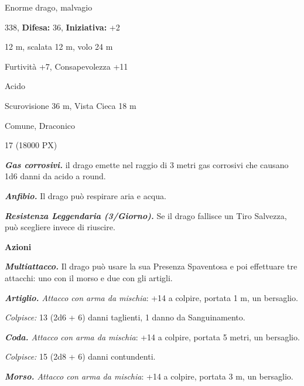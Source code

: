 \begin{multicols}{2}
{
\noindent
\begin{description}[noitemsep, topsep=0pt, parsep=0pt, partopsep=0pt, leftmargin=0cm, labelwidth=2.2cm]
	\item[\textbf{Taglia/Tipo:}] Enorme drago, malvagio
	\item[\textbf{Caratt.:}] 
	\item[\textbf{Punti Ferita:}] 338,  \textbf{Difesa:} 36,  \textbf{Iniziativa:} +2
	\item[\textbf{Movimento:}] 12 m, scalata 12 m, volo 24 m
	\item[\textbf{Tiri Salvez.:}] 
	\item[\textbf{Comp.:}] Furtività +7, Consapevolezza +11
	\item[\textbf{Imm. Danni:}] Acido
	\item[\textbf{Sensi:}] Scurovisione 36 m, Vista Cieca 18 m
	\item[\textbf{Linguaggi:}] Comune, Draconico
	\item[\textbf{Sfida:}] 17 (18000 PX)\smallskip
\end{description}

\emph{\textbf{Gas corrosivi.}} il drago emette nel raggio di 3 metri gas corrosivi che causano 1d6 danni da acido a round.

\emph{\textbf{Anfibio.}} Il drago può respirare aria e acqua.

\emph{\textbf{Resistenza Leggendaria (3/Giorno).}} Se il drago fallisce un Tiro Salvezza, può scegliere invece di riuscire.

\textbf{Azioni}

\emph{\textbf{Multiattacco.}} Il drago può usare la sua Presenza Spaventosa e poi effettuare tre attacchi: uno con il morso e due con gli artigli.

\emph{\textbf{Artiglio.} Attacco con arma da mischia}: +14 a colpire, portata 1 m, un bersaglio.

\emph{Colpisce:} 13 (2d6 + 6) danni taglienti, 1 danno da Sanguinamento.

\emph{\textbf{Coda.} Attacco con arma da mischia}: +14 a colpire, portata 5 metri, un bersaglio.

\emph{Colpisce:} 15 (2d8 + 6) danni contundenti.

\emph{\textbf{Morso.} Attacco con arma da mischia}: +14 a colpire, portata 3 m, un bersaglio.

}
\end{multicols}
